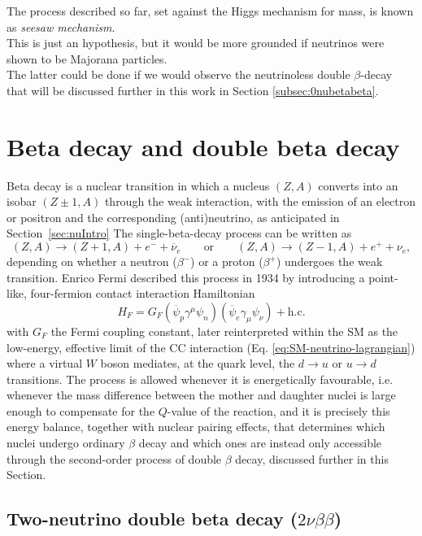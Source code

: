 The process described so far, set against the Higgs mechanism for mass, is known as \textit{seesaw mechanism}.\\
This is just an hypothesis, but it would be more grounded if neutrinos were shown to be Majorana particles.\\
The latter could be done if we would observe the neutrinoless double $\beta$-decay that will be discussed further in this work in Section \ref{subsec:0nubetabeta}.

\section{Beta decay and double beta decay}
Beta decay is a nuclear transition in which a nucleus $(Z, A)$ converts into an isobar $(Z \pm 1, A)$ 
through the weak interaction, with the emission of an electron or positron and the corresponding 
(anti)neutrino, as anticipated in Section~\ref{sec:nuIntro} 
The single-beta-decay process can be written as
\begin{equation}
    \label{eq:single-beta-decay}
    (Z, A) \longrightarrow (Z+1, A) + e^- + \overline{\nu}_e \qquad \text{or} \qquad 
    (Z, A) \longrightarrow (Z-1, A) + e^+ + \nu_e,
\end{equation}
depending on whether a neutron ($\beta^-$) or a proton ($\beta^+$) undergoes the weak transition. 
Enrico Fermi described this process in 1934 by introducing a point-like, four-fermion contact interaction 
Hamiltonian
\begin{equation}
    H_F = G_F \left( \overline{\psi}_p \gamma^\mu \psi_n \right)\left( \overline{\psi}_e \gamma_\mu \psi_\nu \right) + \text{h.c.}
\end{equation} 
with $G_F$ the Fermi coupling constant, later reinterpreted within the \ac{SM} as the low-energy, 
effective limit of the \ac{CC} interaction (Eq. \ref{eq:SM-neutrino-lagrangian}) where a virtual $W$ boson mediates, at the quark level, the $d \to u$ or $u \to d$ transitions. 
The process is allowed whenever it is energetically favourable, i.e. whenever the mass difference between the mother and daughter nuclei is large enough to compensate for the $Q$-value of the reaction, and it is precisely this energy balance, together with nuclear pairing effects, that determines which nuclei undergo ordinary $\beta$ decay and which ones are instead only accessible through the second-order process of double $\beta$ decay, discussed further in this Section.

\subsection{Two-neutrino double beta decay (\texorpdfstring{$2\nu\beta\beta$}{2vbb})}
\label{subsec:2nubetabeta}


